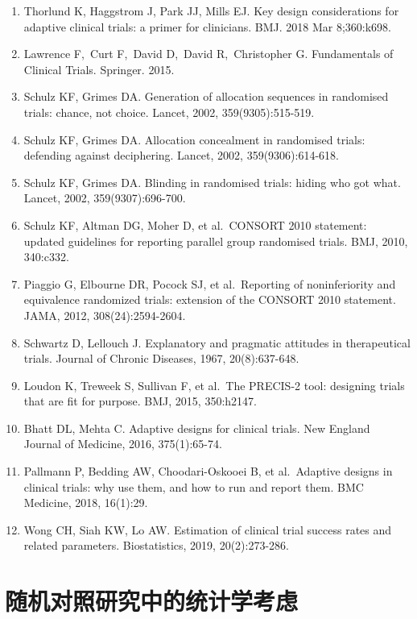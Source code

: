 \documentclass[
  chinese-hans,
  letterpaper,
  DIV=11,
  numbers=noendperiod]{scrreprt}
\begin{document}
\begin{enumerate}
\def\labelenumi{\arabic{enumi}.}
\item
  Thorlund K, Haggstrom J, Park JJ, Mills EJ. Key design considerations
  for adaptive clinical trials: a primer for clinicians. BMJ. 2018 Mar
  8;360:k698.
\item
  Lawrence F,~Curt F,~David D,~David R,~Christopher G. Fundamentals of
  Clinical Trials. Springer. 2015.
\item
  Schulz KF, Grimes DA. Generation of allocation sequences in randomised
  trials: chance, not choice. Lancet, 2002, 359(9305):515-519.
\item
  Schulz KF, Grimes DA. Allocation concealment in randomised trials:
  defending against deciphering. Lancet, 2002, 359(9306):614-618.
\item
  Schulz KF, Grimes DA. Blinding in randomised trials: hiding who got
  what. Lancet, 2002, 359(9307):696-700.
\item
  Schulz KF, Altman DG, Moher D, et al.~CONSORT 2010 statement: updated
  guidelines for reporting parallel group randomised trials. BMJ, 2010,
  340:c332.
\item
  Piaggio G, Elbourne DR, Pocock SJ, et al.~Reporting of noninferiority
  and equivalence randomized trials: extension of the CONSORT 2010
  statement. JAMA, 2012, 308(24):2594-2604.
\item
  Schwartz D, Lellouch J. Explanatory and pragmatic attitudes in
  therapeutical trials. Journal of Chronic Diseases, 1967,
  20(8):637-648.
\item
  Loudon K, Treweek S, Sullivan F, et al.~The PRECIS-2 tool: designing
  trials that are fit for purpose. BMJ, 2015, 350:h2147.
\item
  Bhatt DL, Mehta C. Adaptive designs for clinical trials. New England
  Journal of Medicine, 2016, 375(1):65-74.
\item
  Pallmann P, Bedding AW, Choodari-Oskooei B, et al.~Adaptive designs in
  clinical trials: why use them, and how to run and report them. BMC
  Medicine, 2018, 16(1):29.
\item
  Wong CH, Siah KW, Lo AW. Estimation of clinical trial success rates
  and related parameters. Biostatistics, 2019, 20(2):273-286.
\end{enumerate}


\chapter{随机对照研究中的统计学考虑}\label{ux968fux673aux5bf9ux7167ux7814ux7a76ux4e2dux7684ux7edfux8ba1ux5b66ux8003ux8651}
\end{document}
